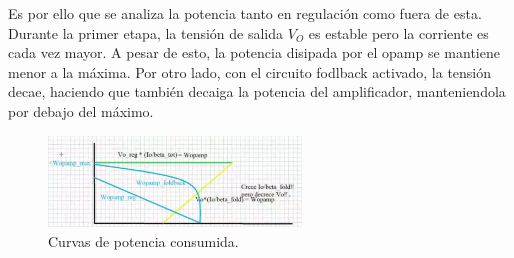 Es por ello que se analiza la potencia tanto en regulación como fuera de esta. Durante la primer etapa, la tensión de salida $V_O$ es estable pero la corriente es cada vez mayor. A pesar de esto, la potencia disipada por el opamp se mantiene menor a la máxima. Por otro lado, con el circuito fodlback activado, la tensión decae, haciendo que también decaiga la potencia del amplificador, manteniendola por debajo del máximo.
\begin{figure}[H]
\centering
	\includegraphics[width=0.6\textwidth]{ImagenesEjercicio2/Potencia2.png}
	\caption{Curvas de potencia consumida.}
	\label{fig:curvapot}
\end{figure}


